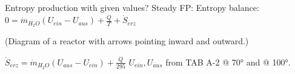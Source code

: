 Entropy production with given values?  
Steady FP: Entropy balance:  
\( 0 = \dot{m}_{H_2O} (U_{ein} - U_{aus}) + \frac{\dot{Q}}{T} + \dot{S}_{erz} \)  

(Diagram of a reactor with arrows pointing inward and outward.)  

\( \dot{S}_{erz} = \dot{m}_{H_2O} (U_{aus} - U_{ein}) + \frac{\dot{Q}}{295} \)  
\( U_{ein}, U_{aus} \) from TAB A-2 @ 70° and @ 100°.